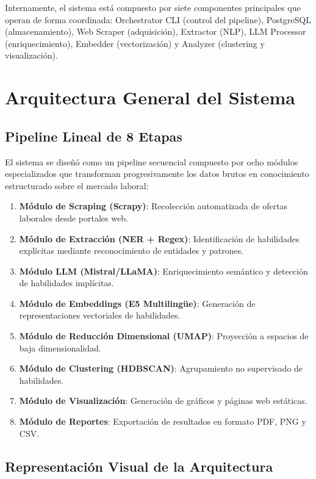 Internamente, el sistema está compuesto por siete componentes principales que operan de forma coordinada: Orchestrator CLI (control del pipeline), PostgreSQL (almacenamiento), Web Scraper (adquisición), Extractor (NLP), LLM Processor (enriquecimiento), Embedder (vectorización) y Analyzer (clustering y visualización).

\section{Arquitectura General del Sistema}

\subsection{Pipeline Lineal de 8 Etapas}

El sistema se diseñó como un pipeline secuencial compuesto por ocho módulos especializados que transforman progresivamente los datos brutos en conocimiento estructurado sobre el mercado laboral:

\begin{enumerate}
    \item \textbf{Módulo de Scraping (Scrapy)}: Recolección automatizada de ofertas laborales desde portales web.
    \item \textbf{Módulo de Extracción (NER + Regex)}: Identificación de habilidades explícitas mediante reconocimiento de entidades y patrones.
    \item \textbf{Módulo LLM (Mistral/LLaMA)}: Enriquecimiento semántico y detección de habilidades implícitas.
    \item \textbf{Módulo de Embeddings (E5 Multilingüe)}: Generación de representaciones vectoriales de habilidades.
    \item \textbf{Módulo de Reducción Dimensional (UMAP)}: Proyección a espacios de baja dimensionalidad.
    \item \textbf{Módulo de Clustering (HDBSCAN)}: Agrupamiento no supervisado de habilidades.
    \item \textbf{Módulo de Visualización}: Generación de gráficos y páginas web estáticas.
    \item \textbf{Módulo de Reportes}: Exportación de resultados en formato PDF, PNG y CSV.
\end{enumerate}

\subsection{Representación Visual de la Arquitectura}

